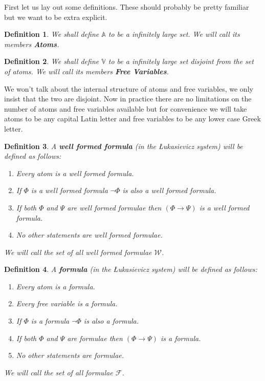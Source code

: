 \documentclass{article}
\newtheorem{defin}{Definition}
\begin{document}
First let us lay out some definitions.
These should probably be pretty familiar but we want to be extra explicit.

\begin{defin}
We shall define $\mathbb{A}$ to be a infinitely large set.
We will call its members \textbf{Atoms}.
\end{defin}

\begin{defin}
We shall define $\mathbb{V}$ to be a infinitely large set disjoint from the set of atoms.
We will call its members \textbf{Free Variables}.
\end{defin}

We won't talk about the internal structure of atoms and free variables, we only insist that the two are disjoint.
Now in practice there are no limitations on the number of atoms and free variables available but for convenience we will take atoms to be any capital Latin letter and free variables to be any lower case Greek letter.

\begin{defin}
A \textbf{well formed formula} (in the \L ukasievicz system) will be defined as follows:
\begin{enumerate}
\item Every atom is a well formed formula.
\item If $\Phi$ is a well formed formula $\neg\Phi$ is also a well formed formula.
\item If both $\Phi$ and $\Psi$ are well formed formulae then $(\Phi\rightarrow\Psi)$ is a well formed formula.
\item No other statements are well formed formulae.
\end{enumerate}
We will call the set of all well formed formulae $\mathcal{W}$.
\end{defin}


\begin{defin}
A \textbf{formula} (in the \L ukasievicz system) will be defined as follows:
\begin{enumerate}
\item Every atom is a formula.
\item Every free variable is a formula.
\item If $\Phi$ is a formula $\neg\Phi$ is also a formula.
\item If both $\Phi$ and $\Psi$ are formulae then $(\Phi\rightarrow\Psi)$ is a formula.
\item No other statements are formulae.
\end{enumerate}
We will call the set of all formulae $\mathcal{F}$.
\end{defin}
\end{document}
